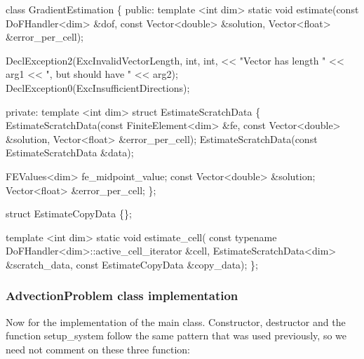 \begin{DoxyCode}
\textcolor{keyword}{class }GradientEstimation \{
\textcolor{keyword}{public}:
    \textcolor{keyword}{template} <\textcolor{keywordtype}{int} dim>
    \textcolor{keyword}{static} \textcolor{keywordtype}{void} estimate(\textcolor{keyword}{const} DoFHandler<dim> &dof,
                         \textcolor{keyword}{const} Vector<double> &solution,
                         Vector<float> &error\_per\_cell);

    DeclException2(ExcInvalidVectorLength, \textcolor{keywordtype}{int}, \textcolor{keywordtype}{int},
                   << \textcolor{stringliteral}{"Vector has length "} << arg1 << \textcolor{stringliteral}{", but should have "}
                   << arg2);
    DeclException0(ExcInsufficientDirections);

\textcolor{keyword}{private}:
    \textcolor{keyword}{template} <\textcolor{keywordtype}{int} dim>
    \textcolor{keyword}{struct }EstimateScratchData \{
        EstimateScratchData(\textcolor{keyword}{const} FiniteElement<dim> &fe,
                            \textcolor{keyword}{const} Vector<double> &solution,
                            Vector<float> &error\_per\_cell);
        EstimateScratchData(\textcolor{keyword}{const} EstimateScratchData &data);

        FEValues<dim> fe\_midpoint\_value;
        \textcolor{keyword}{const} Vector<double> &solution;
        Vector<float> &error\_per\_cell;
    \};

    \textcolor{keyword}{struct }EstimateCopyData \{\};

    \textcolor{keyword}{template} <\textcolor{keywordtype}{int} dim>
    \textcolor{keyword}{static} \textcolor{keywordtype}{void} estimate\_cell(
        \textcolor{keyword}{const} \textcolor{keyword}{typename} DoFHandler<dim>::active\_cell\_iterator &cell,
        EstimateScratchData<dim> &scratch\_data,
        \textcolor{keyword}{const} EstimateCopyData &copy\_data);
\};
\end{DoxyCode}


\label{_AdvectionProblemclassimplementation}%
 \subsubsection*{Advection\+Problem class implementation}

Now for the implementation of the main class. Constructor, destructor and the function {\ttfamily setup\+\_\+system} follow the same pattern that was used previously, so we need not comment on these three function\+:


